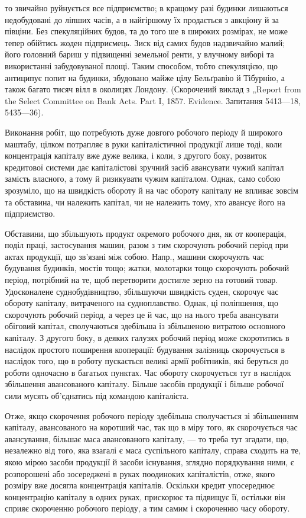 то звичайно руйнується все підприємство; в кращому разі будинки
лишаються недобудовані до ліпших часів, а в найгіршому їх продається
з авкціону й за півціни. Без спекуляційних будов, та до того ше в широких
розмірах, не може тепер обійтись жоден підприємець. Зиск від
самих будов надзвичайно малий; його головний бариш у підвищенні
земельної ренти, у влучному виборі та використанні забудовуваної площі.
Таким способом, тобто спекуляцією, що антиципує попит на будинки,
збудовано майже цілу Бельґравію й Тібурнію, а також багато тисяч вілл
в околицях Лондону. (Скорочений виклад з „Report from the Select
Committee on Bank Acts. Part I, 1857. Evidence. Запитання 5413—18,
5435—36).

Виконання робіт, що потребують дуже довгого робочого періоду й
широкого маштабу, цілком потрапляє в руки капіталістичної
продукції лише тоді, коли концентрація капіталу вже дуже велика, і
коли, з другого боку, розвиток кредитової системи дає капіталістові зручний
засіб авансувати чужий капітал замість власного, а тому й ризикувати
чужим капіталом. Однак, само собою зрозуміло, що на швидкість обороту
й на час обороту капіталу не впливає зовсім та обставина, чи належить
капітал, чи не належить тому, хто авансує його на підприємство.

Обставини, що збільшують продукт окремого робочого дня, як от кооперація,
поділ праці, застосування машин, разом з тим скорочують робочий
період при актах продукції, що зв’язані між собою. Напр., машини
скорочують час будування будинків, мостів тощо; жатки, молотарки
тощо скорочують робочий період, потрібний на те, щоб перетворити
достигле зерно на готовий товар. Удосконалене суднобудівництво, збільшуючи
швидкість суден, скорочує час обороту капіталу, витраченого на
судноплавство. Однак, ці поліпшення, що скорочують робочий період, а
через це й час, що на нього треба авансувати обіговий капітал, сполучаються
здебільша із збільшеною витратою основного капіталу. З другого
боку, в деяких галузях робочий період може скоротитись в наслідок
простого поширення кооперації: будування залізниць скорочується
в наслідок того, що в роботу пускається великі армії робітників, які
беруться до роботи одночасно в багатьох пунктах. Час обороту скорочується
тут в наслідок збільшення авансованого капіталу. Більше засобів
продукції і більше робочої сили мусять об’єднатись під командою
капіталіста.

Отже, якщо скорочення робочого періоду здебільша сполучається зі
збільшенням капіталу, авансованого на коротший час, так що в міру того,
як скорочується час авансування, більшає маса авансованого капіталу, — то
треба тут згадати, що, незалежно від того, яка взагалі є маса суспільного
капіталу, справа сходить на те, якою мірою засоби продукції й засоби
існування, зглядно порядкування ними, є розпорошені або зосереджені
в руках поодиноких капіталістів, отже, якого розміру вже
досягла концентрація капіталів. Оскільки кредит упосереднює концентрацію
капіталу в одних руках, прискорює та підвищує її, остільки він
сприяє скороченню робочого періоду, а тим самим і скороченню часу обороту.
